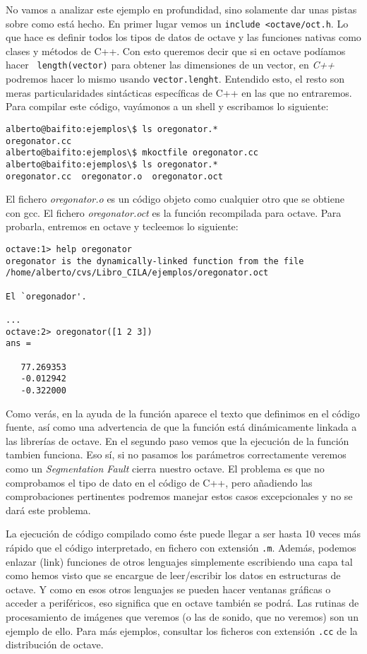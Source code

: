 No  vamos  a analizar  este  ejemplo  en profundidad,  sino  solamente
dar  unas pistas  sobre  como está  hecho. En  primer  lugar vemos  un
\verb|include <octave/oct.h|. Lo  que hace es definir  todos los tipos
de datos  de octave y las  funciones nativas como clases  y métodos de
C++. Con  esto queremos  decir que  si en  octave podíamos  hacer {\tt
length(vector)} para  obtener las  dimensiones de  un vector,  en {\em
C++}  podremos hacer  lo mismo  usando {\tt  vector.lenght}. Entendido
esto, el  resto son meras particularidades  sintácticas específicas de
C++ en las  que no entraremos. Para compilar este  código, vayámonos a
un shell y escribamos lo siguiente:

\begin{verbatim}
alberto@baifito:ejemplos\$ ls oregonator.*
oregonator.cc
alberto@baifito:ejemplos\$ mkoctfile oregonator.cc 
alberto@baifito:ejemplos\$ ls oregonator.*
oregonator.cc  oregonator.o  oregonator.oct
\end{verbatim}

El fichero {\em oregonator.o} es  un código objeto como cualquier otro
que se obtiene con gcc. El  fichero {\em oregonator.oct} es la función
recompilada para octave. Para probarla, entremos en octave y tecleemos
lo siguiente:

\begin{verbatim}
octave:1> help oregonator  
oregonator is the dynamically-linked function from the file
/home/alberto/cvs/Libro_CILA/ejemplos/oregonator.oct

El `oregonador'.

...
octave:2> oregonator([1 2 3]) 
ans =

   77.269353
   -0.012942
   -0.322000
\end{verbatim}

Como verás, en  la ayuda de la función aparece  el texto que definimos
en el código  fuente, así como una advertencia de  que la función está
dinámicamente linkada  a las librerías  de octave. En el  segundo paso
vemos que la  ejecución de la función tambien funciona.  Eso sí, si no
pasamos los parámetros correctamente veremos como un {\em Segmentation
Fault} cierra  nuestro octave.  El problema es  que no  comprobamos el
tipo de  dato en el código  de C++, pero añadiendo  las comprobaciones
pertinentes podremos  manejar estos casos  excepcionales y no  se dará
este problema.

La ejecución de código compilado como éste puede llegar a ser hasta 10
veces más rápido que el  código interpretado, en fichero con extensión
\verb|.m|. Además, podemos enlazar (link) funciones de otros lenguajes
simplemente escribiendo una capa tal  como hemos visto que se encargue
de leer/escribir  los datos en estructuras  de octave. Y como  en esos
otros  lenguajes  se  pueden  hacer  ventanas  gráficas  o  acceder  a
periféricos, eso significa que en octave también se podrá. Las rutinas
de procesamiento  de imágenes  que veremos  (o las  de sonido,  que no
veremos)  son un  ejemplo de  ello. Para  más ejemplos,  consultar los
ficheros con extensión \verb|.cc| de la distribución de octave.

